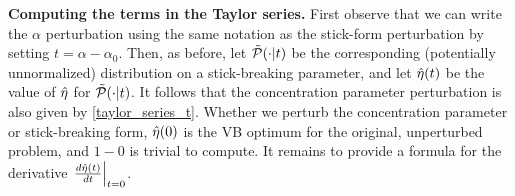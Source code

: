 \noindent \textbf{Computing the terms in the Taylor series.} First observe that
we can write the $\alpha$ perturbation using the same notation as the stick-form
perturbation by setting $t = \alpha - \alpha_0$. Then, as before, let
$\tilde{\mathcal{P}}(\cdot \vert t)$ be the corresponding (potentially unnormalized)
distribution on a stick-breaking parameter, and let $\hat\eta(t)$ be the value of
$\hat\eta$ for $\tilde{\mathcal{P}}(\cdot \vert t)$. It follows that the concentration
parameter perturbation is also given by \eqref{taylor_series_t}. Whether we
perturb the concentration parameter or stick-breaking form, $\hat\eta(0)$ is the
VB optimum for the original, unperturbed problem, and $1-0$ is trivial to
compute. It remains to provide a formula for the derivative
$\left.\frac{d\hat\eta(t)}{dt}\right\vert_{t=0}$.
%


